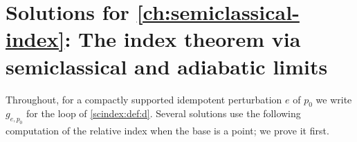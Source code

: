 \providecommand{\Kc}{K_{\mathrm{c}}}
\providecommand{\inda}{\operatorname{ind}_{\mathrm{a}}}
\providecommand{\Ginf}{G^{-\infty}}
\providecommand{\Indsl}[1]{\operatorname{Ind}^{#1}_{\mathrm{sl}}}
\providecommand{\indT}{\operatorname{ind}_{\mathcal T}}
\providecommand{\Psisl}[1]{\Psi^{#1}_{\mathrm{sl}}}
\providecommand{\Psiinf}{\Psi^{-\infty}_{\epsilon^\infty}}
\providecommand{\sigsl}{\sigma_{\mathrm{sl}}}
\providecommand{\Ope}{\operatorname{Op}_\epsilon}
\providecommand{\Torus}{\mathbb{T}}
\providecommand{\wind}{\operatorname{wind}}

\section{Solutions for \cref{ch:semiclassical-index}: The index theorem via semiclassical and adiabatic limits}\label{solutions:semiclassical-index}

Throughout, for a compactly supported idempotent perturbation $e$ of $p_0$ we write
$g_{e,p_0}$ for the loop of \cref{scindex:def:d}. Several solutions use the
following computation of the relative index when the base is a point; we prove it
first.

